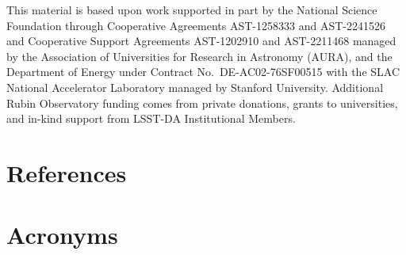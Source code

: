 \documentclass[OPS,lsstdraft,authoryear,toc]{lsstdoc}
\begin{document}
This material is based upon work supported in part by the National Science Foundation through Cooperative Agreements AST-1258333 and AST-2241526 and Cooperative Support Agreements AST-1202910 and AST-2211468 managed by the Association of Universities for Research in Astronomy (AURA), and the Department of Energy under Contract No.\ DE-AC02-76SF00515 with the SLAC National Accelerator Laboratory managed by Stanford University.
Additional Rubin Observatory funding comes from private donations, grants to universities, and in-kind support from LSST-DA Institutional Members.

\section{References} \label{sec:bib}
\renewcommand{\refname}{} %


\section{Acronyms} \label{sec:acronyms}

\end{document}
